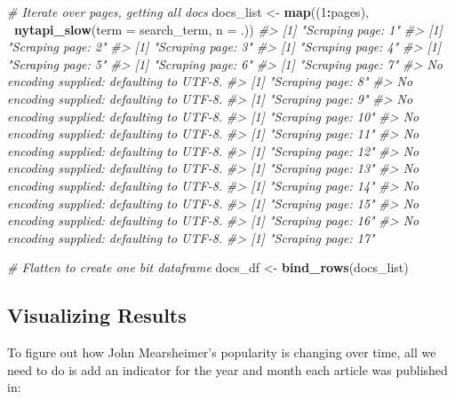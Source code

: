 \documentclass[
]{book}
\newenvironment{Shaded}{\begin{snugshade}}{\end{snugshade}}
\newcommand{\CommentTok}[1]{\textcolor[rgb]{0.56,0.35,0.01}{\textit{#1}}}
\newcommand{\DataTypeTok}[1]{\textcolor[rgb]{0.13,0.29,0.53}{#1}}
\newcommand{\DecValTok}[1]{\textcolor[rgb]{0.00,0.00,0.81}{#1}}
\newcommand{\KeywordTok}[1]{\textcolor[rgb]{0.13,0.29,0.53}{\textbf{#1}}}
\newcommand{\NormalTok}[1]{#1}
\newcommand{\OperatorTok}[1]{\textcolor[rgb]{0.81,0.36,0.00}{\textbf{#1}}}
\newcommand{\StringTok}[1]{\textcolor[rgb]{0.31,0.60,0.02}{#1}}
\begin{document}
\begin{Shaded}
\begin{Highlighting}[]
\CommentTok{# Iterate over pages, getting all docs}
\NormalTok{docs_list <-}\StringTok{ }\KeywordTok{map}\NormalTok{((}\DecValTok{1}\OperatorTok{:}\NormalTok{pages), }\OperatorTok{~}\KeywordTok{nytapi_slow}\NormalTok{(}\DataTypeTok{term =}\NormalTok{ search_term, }\DataTypeTok{n =}\NormalTok{ .))}
\CommentTok{#> [1] "Scraping page:  1"}
\CommentTok{#> [1] "Scraping page:  2"}
\CommentTok{#> [1] "Scraping page:  3"}
\CommentTok{#> [1] "Scraping page:  4"}
\CommentTok{#> [1] "Scraping page:  5"}
\CommentTok{#> [1] "Scraping page:  6"}
\CommentTok{#> [1] "Scraping page:  7"}
\CommentTok{#> No encoding supplied: defaulting to UTF-8.}
\CommentTok{#> [1] "Scraping page:  8"}
\CommentTok{#> No encoding supplied: defaulting to UTF-8.}
\CommentTok{#> [1] "Scraping page:  9"}
\CommentTok{#> No encoding supplied: defaulting to UTF-8.}
\CommentTok{#> [1] "Scraping page:  10"}
\CommentTok{#> No encoding supplied: defaulting to UTF-8.}
\CommentTok{#> [1] "Scraping page:  11"}
\CommentTok{#> No encoding supplied: defaulting to UTF-8.}
\CommentTok{#> [1] "Scraping page:  12"}
\CommentTok{#> No encoding supplied: defaulting to UTF-8.}
\CommentTok{#> [1] "Scraping page:  13"}
\CommentTok{#> No encoding supplied: defaulting to UTF-8.}
\CommentTok{#> [1] "Scraping page:  14"}
\CommentTok{#> No encoding supplied: defaulting to UTF-8.}
\CommentTok{#> [1] "Scraping page:  15"}
\CommentTok{#> No encoding supplied: defaulting to UTF-8.}
\CommentTok{#> [1] "Scraping page:  16"}
\CommentTok{#> No encoding supplied: defaulting to UTF-8.}
\CommentTok{#> [1] "Scraping page:  17"}

\CommentTok{# Flatten to create one bit dataframe}
\NormalTok{docs_df <-}\StringTok{ }\KeywordTok{bind_rows}\NormalTok{(docs_list)}
\end{Highlighting}
\end{Shaded}

\hypertarget{visualizing-results}{%
\subsection{Visualizing Results}\label{visualizing-results}}

To figure out how John Mearsheimer's popularity is changing over time, all we need to do is add an indicator for the year and month each article was published in:
\end{document}
